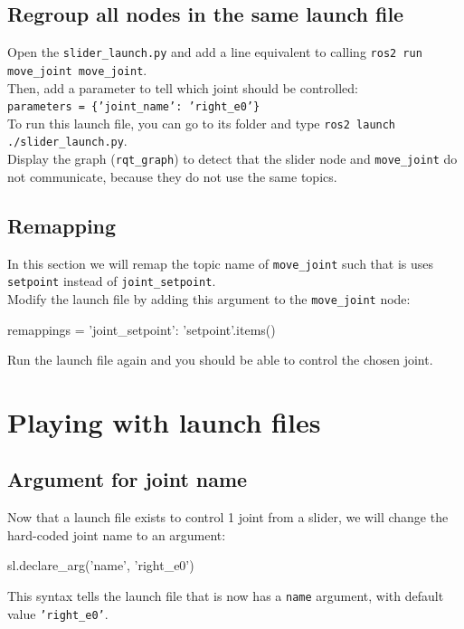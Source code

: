 \documentclass{ecnreport}
\begin{document}
\subsection{Regroup all nodes in the same launch file}

Open the \texttt{slider\_launch.py} and add a line equivalent to calling \texttt{ros2 run move\_joint move\_joint}.\\
Then, add a parameter to tell which joint should be controlled:\\\texttt{parameters = \{'joint\_name': 'right\_e0'\}}\\

To run this launch file, you can go to its folder and type \texttt{ros2 launch ./slider\_launch.py}.\\
Display the graph (\texttt{rqt\_graph}) to detect that the slider node and \texttt{move\_joint} do not communicate, because they do not use the same topics.

\subsection{Remapping}

In this section we will remap the topic name of \texttt{move\_joint} such that is uses \texttt{setpoint} instead of \texttt{joint\_setpoint}.\\

Modify the launch file by adding this argument to the \texttt{move\_joint} node:

\begin{pythoncodelarge}
remappings = {'joint_setpoint': 'setpoint'}.items()
\end{pythoncodelarge}
Run the launch file again and you should be able to control the chosen joint.

\section{Playing with launch files}

\subsection{Argument for joint name}

Now that a launch file exists to control 1 joint from a slider, we will change the hard-coded joint name to an argument:
\begin{pythoncodelarge}
sl.declare_arg('name', 'right_e0')
\end{pythoncodelarge}
This syntax tells the launch file that is now has a \texttt{name} argument, with default value \texttt{'right\_e0'}.\\
\end{document}

